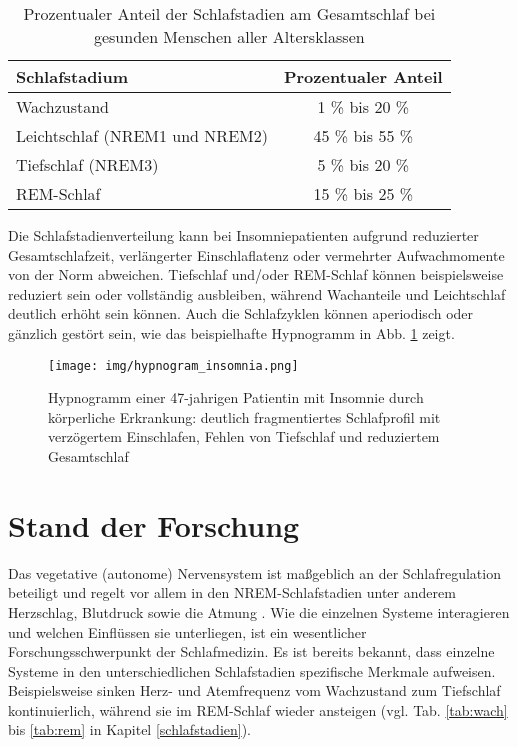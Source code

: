 \begin{table}[H] 
\centering
\begin{small}
\begin{tabular}{lc}
\toprule
\multicolumn{1}{l}{\textbf{Schlafstadium}} & \multicolumn{1}{c}{\textbf{Prozentualer Anteil}}\\  
\midrule
Wachzustand & 1 \% bis 20 \%\\
Leichtschlaf (\acs{NREM}1 und \acs{NREM}2) & 45 \% bis 55 \%\\
Tiefschlaf (\acs{NREM}3) & 5 \% bis 20 \%\\
\acs{REM}-Schlaf & 15 \% bis 25 \%\\
\bottomrule
\end{tabular}
\caption[Prozentuale Schlafstadienverteilung]{Prozentualer Anteil der Schlafstadien am Gesamtschlaf bei gesunden Menschen aller Altersklassen \parencite{lee-chiong_sleep_2008, steinberg_schlafmedizin_2010, danker-hopfe_percentile_2005}}
\label{tab:anteile_schlafstadien}
\end{small}
\end{table}


Die Schlafstadienverteilung kann bei Insomniepatienten aufgrund reduzierter Gesamtschlafzeit, verlängerter Einschlaflatenz oder vermehrter Aufwachmomente von der Norm abweichen. Tiefschlaf und/oder \acs{REM}-Schlaf können beispielsweise reduziert sein oder vollständig ausbleiben, während Wachanteile und Leichtschlaf deutlich erhöht sein können. Auch die Schlafzyklen können aperiodisch oder gänzlich gestört sein, wie das beispielhafte Hypnogramm in Abb. \ref{fig:hypnogram_insomnia} zeigt. \parencite{happe_schlafmedizin_2009}

\begin{figure}[H]
	\centering
	\texttt{[image: img/hypnogram\_insomnia.png]}
	\caption[Hypnogramm von gestörtem Schlaf]{Hypnogramm einer 47-jahrigen Patientin mit Insomnie durch körperliche Erkrankung: deutlich fragmentiertes Schlafprofil mit verzögertem Einschlafen, Fehlen von Tiefschlaf und reduziertem Gesamtschlaf  \parencite{happe_schlafmedizin_2009}}
	\label{fig:hypnogram_insomnia}
\end{figure}

\section{Stand der Forschung}\label{stand} 

Das vegetative (autonome) Nervensystem ist maßgeblich an der Schlafregulation beteiligt und regelt vor allem in den \acs{NREM}-Schlafstadien unter anderem Herzschlag, Blutdruck sowie die Atmung \parencite{steinberg_schlafmedizin_2010}. Wie die einzelnen Systeme interagieren und welchen Einflüssen sie unterliegen, ist ein wesentlicher Forschungsschwerpunkt der Schlafmedizin. Es ist bereits bekannt, dass einzelne Systeme in den unterschiedlichen Schlafstadien spezifische Merkmale aufweisen. Beispielsweise sinken Herz- und Atemfrequenz vom Wachzustand zum Tiefschlaf kontinuierlich, während sie im \acs{REM}-Schlaf wieder ansteigen (vgl. Tab. \ref{tab:wach} bis \ref{tab:rem} in Kapitel \ref{schlafstadien}). \parencite{lee-chiong_sleep_2008, rasche_update_2003, penzel_schlafstorungen_2005}\\

